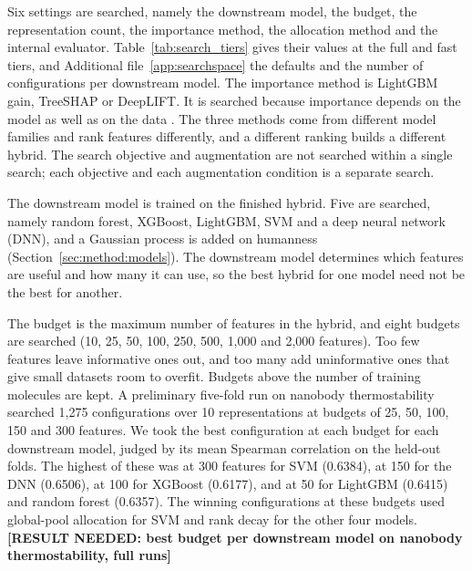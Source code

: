 Six settings are searched, namely the downstream model, the budget, the representation count, the importance method, the allocation method and the internal evaluator. Table~\ref{tab:search_tiers} gives their values at the full and fast tiers, and Additional file~\ref{app:searchspace} the defaults and the number of configurations per downstream model. The importance method is LightGBM gain, TreeSHAP or DeepLIFT. It is searched because importance depends on the model as well as on the data \citep{Dong2020}. The three methods come from different model families and rank features differently, and a different ranking builds a different hybrid. The search objective and augmentation are not searched within a single search; each objective and each augmentation condition is a separate search.

The downstream model is trained on the finished hybrid. Five are searched, namely random forest, XGBoost, LightGBM, SVM and a deep neural network (DNN), and a Gaussian process is added on humanness (Section~\ref{sec:method:models}). The downstream model determines which features are useful and how many it can use, so the best hybrid for one model need not be the best for another.

The budget is the maximum number of features in the hybrid, and eight budgets are searched (10, 25, 50, 100, 250, 500, 1,000 and 2,000 features). Too few features leave informative ones out, and too many add uninformative ones that give small datasets room to overfit. Budgets above the number of training molecules are kept. A preliminary five-fold run on nanobody thermostability searched 1,275 configurations over 10 representations at budgets of 25, 50, 100, 150 and 300 features. We took the best configuration at each budget for each downstream model, judged by its mean Spearman correlation on the held-out folds. The highest of these was at 300 features for SVM (0.6384), at 150 for the DNN (0.6506), at 100 for XGBoost (0.6177), and at 50 for LightGBM (0.6415) and random forest (0.6357). The winning configurations at these budgets used global-pool allocation for SVM and rank decay for the other four models. %
\textbf{[RESULT NEEDED: best budget per downstream model on nanobody thermostability, full runs]}

